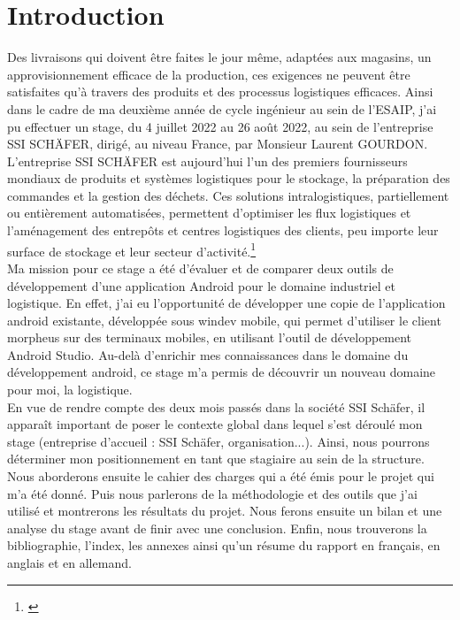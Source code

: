 \documentclass[a4paper, 12pt, french]{article}
\begin{document}
	\newpage
	
	\singlespacing

	\section*{Introduction}
	Des livraisons qui doivent être faites le jour même, adaptées aux magasins, un approvisionnement efficace de la production, ces exigences ne peuvent être satisfaites qu'à travers des produits et des processus logistiques efficaces. Ainsi dans le cadre de ma deuxième année de cycle ingénieur au sein de l’ESAIP, j’ai pu effectuer un stage, du 4 juillet 2022 au 26 août 2022, au sein de l’entreprise SSI SCHÄFER, dirigé, au niveau France, par Monsieur Laurent GOURDON.\\

	L'entreprise SSI SCHÄFER est aujourd'hui l'un des premiers fournisseurs mondiaux de produits et systèmes logistiques pour le stockage, la préparation des commandes et la gestion des déchets. Ces solutions intralogistiques, partiellement ou entièrement automatisées, permettent d’optimiser les flux logistiques et l’aménagement des entrepôts et centres logistiques des clients, peu importe leur surface de stockage et leur secteur d’activité.\footnote{\cite{schaefer}}\\

	Ma mission pour ce stage a été d'évaluer et de comparer deux outils de développement d'une application Android pour le domaine industriel et logistique. En effet, j'ai eu l'opportunité de développer une copie de l'application android existante, développée sous windev mobile, qui permet d'utiliser le client morpheus sur des terminaux mobiles, en utilisant l'outil de développement Android Studio. Au-delà d'enrichir mes connaissances dans le domaine du développement android, ce stage m'a permis de découvrir un nouveau domaine pour moi, la logistique.\\

	En vue de rendre compte des deux mois passés dans la société SSI Schäfer, il apparaît important de poser le contexte global dans lequel s'est déroulé mon stage (entreprise d'accueil : SSI Schäfer, organisation...). Ainsi, nous pourrons déterminer mon positionnement en tant que stagiaire au sein de la structure. Nous aborderons ensuite le cahier des charges qui a été émis pour le projet qui m'a été donné. Puis nous parlerons de la méthodologie et des outils que j'ai utilisé et montrerons les résultats du projet. Nous ferons ensuite un bilan et une analyse du stage avant de finir avec une conclusion. Enfin, nous trouverons la bibliographie, l'index, les annexes ainsi qu'un résume du rapport en français, en anglais et en allemand.
	
\end{document}
